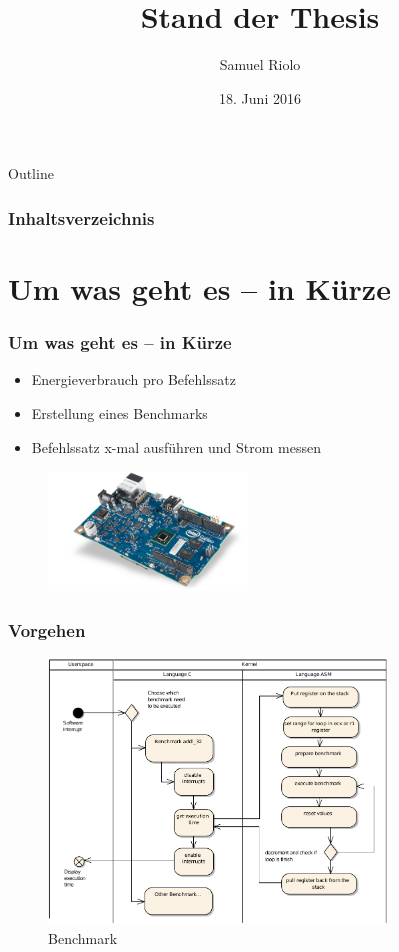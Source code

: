 \documentclass{beamer}
\title[Energie in der Informatik]{Stand der Thesis}
\author{Samuel Riolo}
\institute{FFHS}
\date{18. Juni 2016}
\begin{document}
\begin{frame}
  \titlepage
\end{frame}

\begin{frame}{Outline}
\frametitle{Inhaltsverzeichnis}
    \tableofcontents[]
\end{frame}



\section{Um was geht es -- in K{\"u}rze} 
\begin{frame}
\frametitle{Um was geht es -- in K{\"u}rze} 
\begin{itemize}
\item Energieverbrauch pro Befehlssatz
\item Erstellung eines Benchmarks
\item Befehlssatz x-mal ausführen und Strom messen
\end{itemize}

\begin{figure}
  \includegraphics[width=200px,height=120px]{iot_galileo.png}
\end{figure}	

\end{frame}

\begin{frame}
\frametitle{Vorgehen}
\begin{figure}[H]
\centering
\includegraphics[width=0.8\textwidth]{../thesis/images/benchmark_ea.pdf}
\caption{Benchmark}
\label{fig:Benchmark}
\end{figure}

\end{frame}
\end{document}
